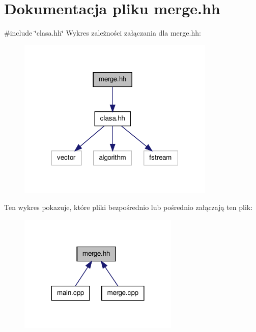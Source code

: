 \hypertarget{merge_8hh}{\section{\-Dokumentacja pliku merge.\-hh}
\label{merge_8hh}
}
{\ttfamily \#include \char`\"{}clasa.\-hh\char`\"{}}\*
\-Wykres zależności załączania dla merge.\-hh\-:\nopagebreak
\begin{figure}[H]
\begin{center}
\leavevmode
\includegraphics[width=266pt]{merge_8hh__incl}
\end{center}
\end{figure}
\-Ten wykres pokazuje, które pliki bezpośrednio lub pośrednio załączają ten plik\-:\nopagebreak
\begin{figure}[H]
\begin{center}
\leavevmode
\includegraphics[width=216pt]{merge_8hh__dep__incl}
\end{center}
\end{figure}
